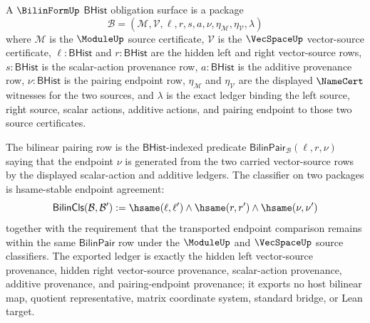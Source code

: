 \begin{definition}
\label{def:bilinform-bhist-obligation-surface}
A $\BilinFormUp$ $\mathsf{BHist}$ obligation surface is a package
$$
\mathcal{B}=(\mathcal{M},\mathcal{V},\ell,r,s,a,\nu,\eta_{\mathcal{M}},\eta_{\mathcal{V}},\lambda)
$$
where $\mathcal{M}$ is the $\ModuleUp$ source certificate, $\mathcal{V}$ is the $\VecSpaceUp$ vector-source certificate, $\ell:\mathsf{BHist}$ and $r:\mathsf{BHist}$ are the hidden left and right vector-source rows, $s:\mathsf{BHist}$ is the scalar-action provenance row, $a:\mathsf{BHist}$ is the additive provenance row, $\nu:\mathsf{BHist}$ is the pairing endpoint row, $\eta_{\mathcal{M}}$ and $\eta_{\mathcal{V}}$ are the displayed $\NameCert$ witnesses for the two sources, and $\lambda$ is the exact ledger binding the left source, right source, scalar actions, additive actions, and pairing endpoint to those two source certificates.

The bilinear pairing row is the $\mathsf{BHist}$-indexed predicate $\mathsf{BilinPair}_{\mathcal{B}}(\ell,r,\nu)$ saying that the endpoint $\nu$ is generated from the two carried vector-source rows by the displayed scalar-action and additive ledgers. The classifier on two packages is hsame-stable endpoint agreement:
$$
\mathsf{BilinCls}(\mathcal{B},\mathcal{B}') :=
\hsame(\ell,\ell')\land\hsame(r,r')\land\hsame(\nu,\nu')
$$
together with the requirement that the transported endpoint comparison remains within the same $\mathsf{BilinPair}$ row under the $\ModuleUp$ and $\VecSpaceUp$ source classifiers. The exported ledger is exactly the hidden left vector-source provenance, hidden right vector-source provenance, scalar-action provenance, additive provenance, and pairing-endpoint provenance; it exports no host bilinear map, quotient representative, matrix coordinate system, standard bridge, or Lean target.
\end{definition}

